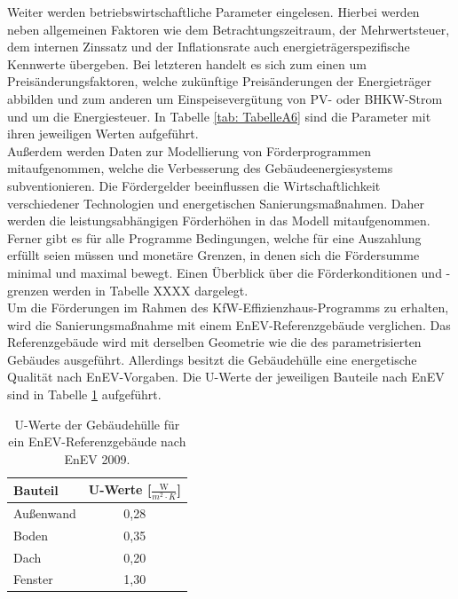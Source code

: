 Weiter werden betriebswirtschaftliche Parameter eingelesen.
Hierbei werden neben allgemeinen Faktoren wie dem Betrachtungszeitraum, der Mehrwertsteuer, dem internen Zinssatz und der Inflationsrate auch energieträgerspezifische Kennwerte übergeben.
Bei letzteren handelt es sich zum einen um Preisänderungsfaktoren, welche zukünftige Preisänderungen der Energieträger abbilden und zum anderen um Einspeisevergütung von PV- oder BHKW-Strom und um die Energiesteuer.
In Tabelle \ref{tab: TabelleA6} sind die Parameter mit ihren jeweiligen Werten aufgeführt.\\
Außerdem werden Daten zur Modellierung von Förderprogrammen mitaufgenommen, welche die Verbesserung des Gebäudeenergiesystems subventionieren.
Die Fördergelder beeinflussen die Wirtschaftlichkeit verschiedener Technologien und energetischen Sanierungsmaßnahmen.
Daher werden die leistungsabhängigen Förderhöhen in das Modell mitaufgenommen.
Ferner gibt es für alle Programme Bedingungen, welche für eine Auszahlung erfüllt seien müssen und monetäre Grenzen, in denen sich die Fördersumme minimal und maximal bewegt.
Einen Überblick über die Förderkonditionen und -grenzen werden in Tabelle XXXX dargelegt.\\
Um die Förderungen im Rahmen des KfW-Effizienzhaus-Programms zu erhalten, wird die Sanierungsmaßnahme mit einem EnEV-Referenzgebäude verglichen.
Das Referenzgebäude wird mit derselben Geometrie wie die des parametrisierten Gebäudes ausgeführt.
Allerdings besitzt die Gebäudehülle eine energetische Qualität nach EnEV-Vorgaben.
Die U-Werte der jeweiligen Bauteile nach EnEV sind in Tabelle \ref{tab: Tabelle322} aufgeführt.

\begin{table}[H]\centering
\begin{tabular}{|l|c|}
\hline
\rowcolor[HTML]{C0C0C0} 
Bauteil & U-Werte {[}\(\frac{\text{W}}{m^2 \cdot K}\){]} \\ \hline
Außenwand & 0,28 \\ \hline
\rowcolor[HTML]{EFEFEF} 
Boden & 0,35 \\ \hline
Dach & 0,20 \\ \hline
\rowcolor[HTML]{EFEFEF} 
Fenster & 1,30 \\ \hline
\end{tabular}
\caption{U-Werte der Gebäudehülle für ein EnEV-Referenzgebäude nach EnEV 2009.}
\label{tab: Tabelle322}
\end{table}

